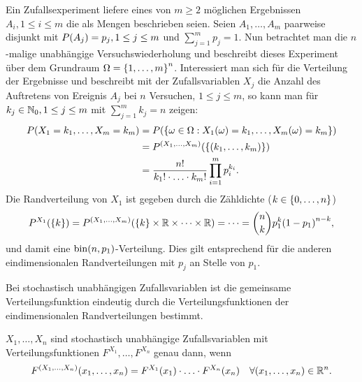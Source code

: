 \documentclass{lecture}
\begin{document}
    \begin{example}
        Ein Zufallsexperiment liefere eines von \(m \ge 2\) möglichen Ergebnissen \(A_i, 1 \le i \le m\) die als Mengen beschrieben seien.
        Seien \(A_1, \ldots, A_m\) paarweise disjunkt mit \(P\parentheses*{A_j} = p_j, 1 \le j \le m\) und \(\sum_{j = 1}^m p_j = 1\).
        Nun betrachtet man die \(n\)-malige unabhängige Versuchswiederholung und beschreibt dieses Experiment über dem Grundraum \(\Omega = \braces*{1, \ldots, m}^n\).
        Interessiert man sich für die Verteilung der Ergebnisse und beschreibt mit der Zufallsvariablen \(X_j\) die Anzahl des Auftretens von Ereignis \(A_j\) bei \(n\) Versuchen, \(1 \le j \le m\), so kann man für \(k_j \in \N_0, 1 \le j \le m\) mit \(\sum_{j = 1}^m k_j = n\) zeigen:
        \begin{align*}
            P\parentheses*{X_1 = k_1, \ldots, X_m = k_m} &= P\parentheses*{\braces*{\omega \in \Omega : X_1\parentheses*{\omega} = k_1, \ldots, X_m\parentheses*{\omega} = k_m}}\\
            &= P^{\parentheses*{X_1, \ldots, X_m}}\parentheses*{\braces*{\parentheses*{k_1, \ldots, k_m}}}\\
            &= \frac{n!}{k_1! \cdot \ldots \cdot k_m!}\prod_{i = 1}^m p_i^{k_i}.
        \end{align*}
        Die Randverteilung von \(X_1\) ist gegeben durch die Zähldichte (\(k \in \braces*{0, \ldots, n}\))
        \[
            P^{X_1}\parentheses*{\braces*{k}} = P^{\parentheses*{X_1, \ldots, X_m}}\parentheses*{\braces*{k} \times \R \times \cdots \times \R} = \cdots = \binom{n}{k}p_1^k\parentheses*{1 - p_1}^{n - k},
        \]
        und damit eine \(\bin\parentheses*{n, p_1}\)-Verteilung.
        Dies gilt entsprechend für die anderen eindimensionalen Randverteilungen mit \(p_j\) an Stelle von \(p_1\).
    \end{example}

    Bei stochastisch unabhängigen Zufallsvariablen ist die gemeinsame Verteilungsfunktion eindeutig durch die Verteilungsfunktionen der eindimensionalen Randverteilungen bestimmt.

    \begin{theorem}
        \(X_1, \ldots, X_n\) sind stochastisch unabhängige Zufallsvariablen mit Verteilungsfunktionen \(F^{X_1}, \ldots, F^{X_n}\) genau dann, wenn
        \[
            F^{\parentheses*{X_1, \ldots, X_n}}\parentheses*{x_1, \ldots, x_n} = F^{X_1}\parentheses*{x_1} \cdot \ldots \cdot F^{X_n}\parentheses*{x_n} \quad \forall\parentheses*{x_1, \ldots, x_n} \in \R^n.
        \]
    \end{theorem}
\end{document}
